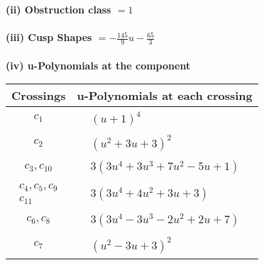 \documentclass[1p]{elsarticle_modified}
\theoremstyle{definition}
\begin{document}
\flushleft \textbf{(ii) Obstruction class $= 1$}\\~\\
\flushleft \textbf{(iii) Cusp Shapes $= -\frac{145}{9} u-\frac{65}{3}$}\\~\\
\newpage\renewcommand{\arraystretch}{1}
\flushleft \textbf{(iv) u-Polynomials at the component}\newline \\
\begin{tabular}{m{50pt}|m{274pt}}
Crossings & \hspace{64pt}u-Polynomials at each crossing \\
\hline $$\begin{aligned}c_{1}\end{aligned}$$&$\begin{aligned}
&(u+1)^4
\end{aligned}$\\
\hline $$\begin{aligned}c_{2}\end{aligned}$$&$\begin{aligned}
&(u^2+3 u+3)^2
\end{aligned}$\\
\hline $$\begin{aligned}c_{3},c_{10}\end{aligned}$$&$\begin{aligned}
&3(3 u^4+3 u^3+7 u^2-5 u+1)
\end{aligned}$\\
\hline $$\begin{aligned}c_{4},c_{5},c_{9}\\c_{11}\end{aligned}$$&$\begin{aligned}
&3(3 u^4+4 u^2+3 u+3)
\end{aligned}$\\
\hline $$\begin{aligned}c_{6},c_{8}\end{aligned}$$&$\begin{aligned}
&3(3 u^4-3 u^3-2 u^2+2 u+7)
\end{aligned}$\\
\hline $$\begin{aligned}c_{7}\end{aligned}$$&$\begin{aligned}
&(u^2-3 u+3)^2
\end{aligned}$\\
\hline
\end{tabular}\\~\\
\end{document}
